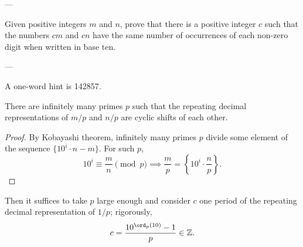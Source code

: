 
---

Given positive integers $m$ and $n$, prove that there is a positive integer $c$ such that the numbers $cm$ and $cn$ have the same number of occurrences of each non-zero digit when written in base ten.

---

A one-word hint is 142857.
\begin{claim*}
    There are infinitely many primes $p$ such that the repeating decimal representations of $m/p$ and $n/p$ are cyclic shifts of each other.
\end{claim*}
\begin{proof}
    By Kobayashi theorem, infinitely many primes $p$ divide some element of the sequence $\{10^i\cdot n-m\}$. For such $p$, \[10^i\equiv\frac mn\pmod p\implies\frac mp=\left\{10^i\cdot\frac np\right\}.\]
\end{proof}

Then it suffices to take $p$ large enough and consider $c$ one period of the repeating decimal representation of $1/p$; rigorously, \[c=\frac{10^{\ord_p(10)}-1}p\in\mathbb Z.\]

